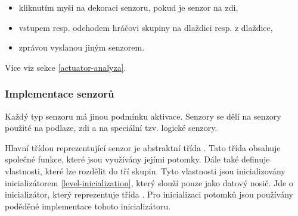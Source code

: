 \begin{itemize}
\item kliknutím myši na dekoraci senzoru, pokud je senzor na zdi, 
\item vstupem resp. odchodem hráčovi skupiny na dlaždici resp. z dlaždice, 
\item zprávou vyslanou jiným senzorem.
\end{itemize}

Více viz sekce \ref{actuator-analyza}.

\subsubsection{Implementace senzorů}

Každý typ senzoru má jinou podmínku aktivace. Senzory se dělí na senzory použité na podlaze, zdi a
na speciální tzv. logické senzory.

Hlavní třídou reprezentující senzor je abstraktní třída . Tato třída obsahuje společné funkce,
které jsou využívány jejími potomky. Dále také definuje vlastnosti, které lze rozdělit do tří skupin.
Tyto vlastnosti jsou inicializovány inicializátorem \vref{level-inicialization}, který slouží pouze jako datový nosič.
Jde o inicializátor, který reprezentuje třída . Pro inicializaci potomků jsou 
používány poděděné implementace tohoto inicializátoru.

